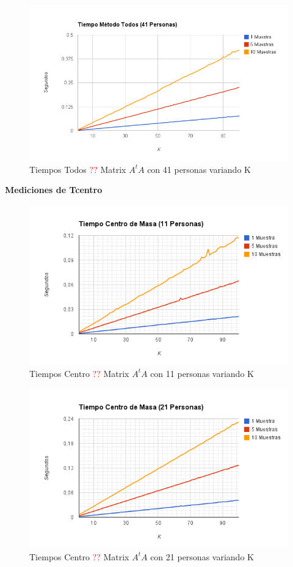 \begin{figure}[H]
\includegraphics[width=1\textwidth]{img/imagef.png}
     \caption{Tiempos Todos \textcolor{red}{??} Matrix $A^tA$ con 41 personas variando K}
     \label{fig:figura1}
\end{figure}

\textbf{Mediciones de Tcentro }

\begin{figure}[H]
\includegraphics[width=1\textwidth]{img/imageg.png}
     \caption{Tiempos Centro \textcolor{red}{??} Matrix $A^tA$ con 11 personas variando K}
     \label{fig:figura1}
\end{figure}

\begin{figure}[H]
\includegraphics[width=1\textwidth]{img/imageh.png}
     \caption{Tiempos Centro \textcolor{red}{??} Matrix $A^tA$ con 21 personas variando K}
     \label{fig:figura1}
\end{figure}

